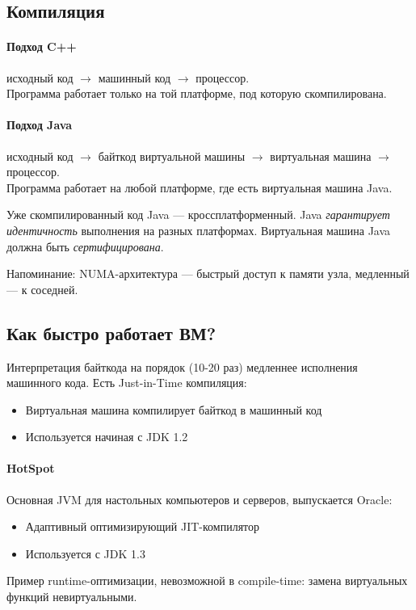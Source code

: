 \subsection{Компиляция}
\paragraph{Подход C++}
исходный код $\to$
машинный код $\to$
процессор. \\
Программа работает только на той платформе, под которую скомпилирована.

\paragraph{Подход Java}
исходный код $\to$
байткод виртуальной машины $\to$
виртуальная машина $\to$
процессор. \\
Программа работает на любой платформе, где есть виртуальная машина Java.

Уже скомпилированный код Java --- кроссплатформенный.
Java \emph{гарантирует идентичность} выполнения на разных платформах.
Виртуальная машина Java должна быть \emph{сертифицирована}.

Напоминание: NUMA-архитектура --- быстрый доступ к памяти узла, медленный --- к соседней.

\subsection{Как быстро работает ВМ?}
Интерпретация байткода на порядок (10-20 раз) медленнее исполнения машинного кода.
Есть Just-in-Time компиляция:
\begin{itemize}
    \item Виртуальная машина компилирует байткод в машинный код
    \item Используется начиная с JDK 1.2
\end{itemize}
\paragraph{HotSpot}
Основная JVM для настольных компьютеров и серверов, выпускается Oracle:
\begin{itemize}
    \item Адаптивный оптимизирующий JIT-компилятор
    \item Используется с JDK 1.3
\end{itemize}

Пример runtime-оптимизации, невозможной в compile-time:
замена виртуальных функций невиртуальными.

